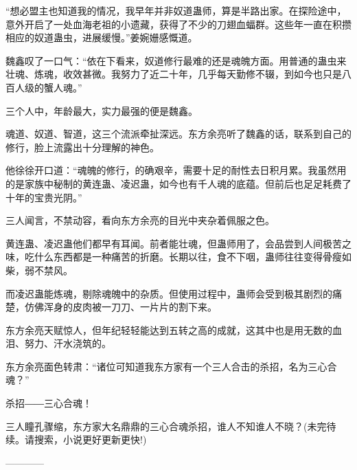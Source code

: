 \begin{this_body}
“想必盟主也知道我的情况，我早年并非奴道蛊师，算是半路出家。在探险途中，意外开启了一处血海老祖的小遗藏，获得了不少的刀翅血蝠群。这些年一直在积攒相应的奴道蛊虫，进展缓慢。”姜婉姗感慨道。

魏鑫叹了一口气：“依在下看来，奴道修行最难的还是魂魄方面。用普通的蛊虫来壮魂、炼魂，收效甚微。我努力了近二十年，几乎每天勤修不辍，到如今也只是八百人级的蟹人魂。”

三个人中，年龄最大，实力最强的便是魏鑫。

魂道、奴道、智道，这三个流派牵扯深远。东方余亮听了魏鑫的话，联系到自己的修行，脸上流露出十分理解的神色。

他徐徐开口道：“魂魄的修行，的确艰辛，需要十足的耐性去日积月累。我虽然用的是家族中秘制的黄连蛊、凌迟蛊，如今也有千人魂的底蕴。但前后也足足耗费了十年的宝贵光阴。”

三人闻言，不禁动容，看向东方余亮的目光中夹杂着佩服之色。

黄连蛊、凌迟蛊他们都早有耳闻。前者能壮魂，但蛊师用了，会品尝到人间极苦之味，吃什么东西都是一种痛苦的折磨。长期以往，食不下咽，蛊师往往变得骨瘦如柴，弱不禁风。

而凌迟蛊能炼魂，剔除魂魄中的杂质。但使用过程中，蛊师会受到极其剧烈的痛楚，仿佛浑身的皮肉被一刀刀、一片片的割下来。

东方余亮天赋惊人，但年纪轻轻能达到五转之高的成就，这其中也是用无数的血泪、努力、汗水浇筑的。

东方余亮面色转肃：“诸位可知道我东方家有一个三人合击的杀招，名为三心合魂？”

杀招――三心合魂！

三人瞳孔骤缩，东方家大名鼎鼎的三心合魂杀招，谁人不知谁人不晓？(未完待续。请搜索，小说更好更新更快!)

------------

\end{this_body}

